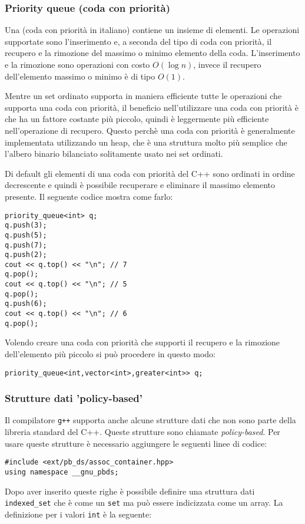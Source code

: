 \subsubsection{Priority queue (coda con priorità)}


Una  (coda con priorità in italiano)
contiene un insieme di elementi.
Le operazioni supportate sono l'inserimento e,
a seconda del tipo di coda con priorità,
il recupero e la rimozione del massimo o minimo elemento 
della coda.
L'inserimento e la rimozione sono operazioni
con costo $O(\log n)$,
invece il recupero dell'elemento massimo o minimo
è di tipo $O(1)$.

Mentre un set ordinato supporta in maniera
efficiente tutte le operazioni che supporta una coda con priorità,
il beneficio nell'utilizzare una coda con priorità è che
ha un fattore costante più piccolo, quindi è leggermente più efficiente 
nell'operazione di recupero. Questo perchè una coda con priorità 
è generalmente implementata utilizzando un heap, che è una 
struttura molto più semplice che l'albero binario bilanciato
solitamente usato nei set ordinati.

\begin{samepage}
Di default gli elementi di una coda con priorità
del C++ sono ordinati in ordine decrescente e quindi è
possibile recuperare e eliminare il massimo
elemento presente.
Il seguente codice mostra come farlo:

\begin{lstlisting}
priority_queue<int> q;
q.push(3);
q.push(5);
q.push(7);
q.push(2);
cout << q.top() << "\n"; // 7
q.pop();
cout << q.top() << "\n"; // 5
q.pop();
q.push(6);
cout << q.top() << "\n"; // 6
q.pop();
\end{lstlisting}
\end{samepage}

Volendo creare una coda con priorità 
che supporti il recupero e la rimozione dell'elemento
più piccolo si può procedere in questo modo:

\begin{lstlisting}
priority_queue<int,vector<int>,greater<int>> q;
\end{lstlisting}

\subsubsection{Strutture dati 'policy-based'}

Il compilatore \texttt{g++} supporta anche 
alcune strutture dati che non sono parte della libreria
standard del C++.
Queste strutture sono chiamate \emph{policy-based}.
Per usare queste strutture è necessario aggiungere 
le seguenti linee di codice:
\begin{lstlisting}
#include <ext/pb_ds/assoc_container.hpp>
using namespace __gnu_pbds; 
\end{lstlisting}
Dopo aver inserito queste righe è possibile definire una struttura
dati \texttt{indexed\_set} che è come un 
\texttt{set} ma può essere indicizzata come un array.
La definizione per i valori \texttt{int} è la seguente:


